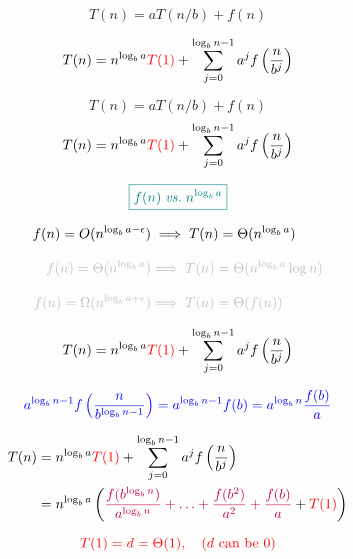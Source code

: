 
\begin{frame}{}
  \[
    T(n) = a T(n/b) + f(n)
  \]


  \[
    T(n) = n^{\log_{b}{a}} \textcolor{red}{T(1)} + 
        \sum_{j = 0}^{\log_{b}{n} - 1} a^{j} f\left(\frac{n}{b^{j}}\right)
  \]
\end{frame}

\begin{frame}{}
  \[
    T(n) = a T(n/b) + f(n)
  \]
  \[
    T(n) = n^{\log_{b}{a}} \textcolor{red}{T(1)} + 
        \sum_{j = 0}^{\log_{b}{n} - 1} a^{j} f\left(\frac{n}{b^{j}}\right)
  \]

  \[
    \textcolor{teal}{\boxed{f(n) \;\text{\it vs.}\; n^{\log_{b}{a}}}}
  \]

  \begin{align*}
    f(n) = O(n^{\log_{b}{a} - \epsilon}) &\implies T(n) = \Theta(n^{\log_{b}{a}}) \\[8pt]
    \gray{f(n) = \Theta(n^{\log_{b}{a}})} &\gray{\implies T(n) = \Theta(n^{\log_{b}{a}} \log n)} \\[8pt]
    \gray{f(n) = \Omega(n^{\log_{b}{a} + \epsilon})} &\gray{\implies T(n) = \Theta(f(n))}
  \end{align*}
\end{frame}

\begin{frame}{}
  \[
    T(n) = n^{\log_{b}{a}} \textcolor{red}{T(1)} + 
        \sum_{j = 0}^{\log_{b}{n} - 1} a^{j} f\left( \frac{n}{b^{j}} \right)
  \]

  \pause
  \[
    \textcolor{blue}{a^{\log_{b}{n} - 1} f\left( \frac{n}{b^{\log_{b}{n} - 1}} \right) 
        = a^{\log_{b}{n} - 1} f(b) = a^{\log_{b}{n}} \frac{f(b)}{a}}
  \]

  \pause
  \begin{align*}
    T(n) &= n^{\log_{b}{a}} \textcolor{red}{T(1)} + 
        \sum_{j = 0}^{\log_{b}{n} - 1} a^{j} f\left(\frac{n}{b^{j}} \right) \\
        &= n^{\log_{b}{a}} \left( \textcolor{purple}{\frac{f(b^{\log_{b}{n}})}{a^{\log_{b}{n}}} + \ldots + \frac{f(b^2)}{a^2} + \frac{f(b)}{a}} + \textcolor{red}{T(1)} \right)
  \end{align*}

  \pause
  \begin{center}
  \end{center}

  \pause
  \vspace{-0.30cm}
  \[
    \textcolor{red}{T(1) = d = \Theta(1), \quad (d \text{ can be } 0)}
  \]
\end{frame}

